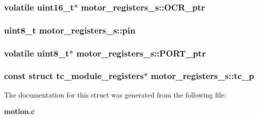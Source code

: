 \subsubsection[{O\+C\+R\+\_\+ptr}]{\setlength{\rightskip}{0pt plus 5cm}volatile uint16\+\_\+t$\ast$ motor\+\_\+registers\+\_\+s\+::\+O\+C\+R\+\_\+ptr}\label{structmotor__registers__s_a9e151bedf793f3664a8acb277988f23a}
\subsubsection[{pin}]{\setlength{\rightskip}{0pt plus 5cm}uint8\+\_\+t motor\+\_\+registers\+\_\+s\+::pin}\label{structmotor__registers__s_a0b1799ba98f3c56dc72f51d490d2b00d}
\subsubsection[{P\+O\+R\+T\+\_\+ptr}]{\setlength{\rightskip}{0pt plus 5cm}volatile uint8\+\_\+t$\ast$ motor\+\_\+registers\+\_\+s\+::\+P\+O\+R\+T\+\_\+ptr}\label{structmotor__registers__s_a530b045599b736fed1e8b6adcb9dcd5f}
\subsubsection[{tc\+\_\+p}]{\setlength{\rightskip}{0pt plus 5cm}const struct {\bf tc\+\_\+module\+\_\+registers}$\ast$ motor\+\_\+registers\+\_\+s\+::tc\+\_\+p}\label{structmotor__registers__s_a99085fa10e4e9ef7cf0a2537abbd6ab2}


The documentation for this struct was generated from the following file\+:\begin{DoxyCompactItemize}
\item 
{\bf motion.\+c}\end{DoxyCompactItemize}
